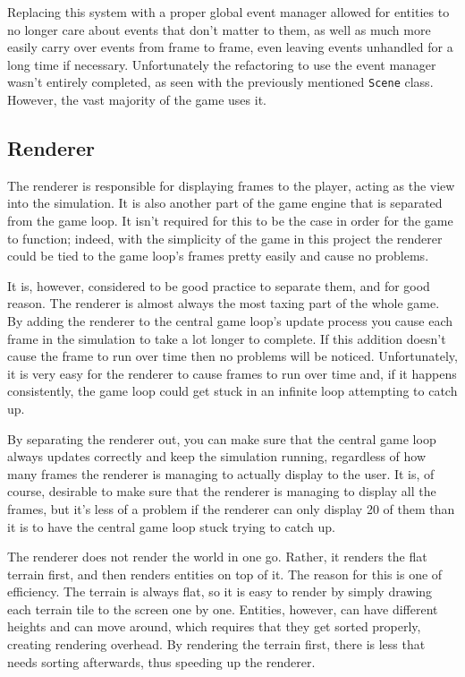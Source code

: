 Replacing this system with a proper global event manager allowed for entities to no longer care about events that don't matter to them, as well as much more easily carry over events from frame to frame, even leaving events unhandled for a long time if necessary. Unfortunately the refactoring to use the event manager wasn't entirely completed, as seen with the previously mentioned \texttt{Scene} class. However, the vast majority of the game uses it.

\subsection{Renderer}
The renderer is responsible for displaying frames to the player, acting as the view into the simulation. It is also another part of the game engine that is separated from the game loop. It isn't required for this to be the case in order for the game to function; indeed, with the simplicity of the game in this project the renderer could be tied to the game loop's frames pretty easily and cause no problems.

It is, however, considered to be good practice to separate them, and for good reason. The renderer is almost always the most taxing part of the whole game. By adding the renderer to the central game loop's update process you cause each frame in the simulation to take a lot longer to complete. If this addition doesn't cause the frame to run over time then no problems will be noticed. Unfortunately, it is very easy for the renderer to cause frames to run over time and, if it happens consistently, the game loop could get stuck in an infinite loop attempting to catch up.

By separating the renderer out, you can make sure that the central game loop always updates correctly and keep the simulation running, regardless of how many frames the renderer is managing to actually display to the user. It is, of course, desirable to make sure that the renderer is managing to display all the frames, but it's less of a problem if the renderer can only display 20 of them than it is to have the central game loop stuck trying to catch up.

The renderer does not render the world in one go. Rather, it renders the flat terrain first, and then renders entities on top of it. The reason for this is one of efficiency. The terrain is always flat, so it is easy to render by simply drawing each terrain tile to the screen one by one. Entities, however, can have different heights and can move around, which requires that they get sorted properly, creating rendering overhead. By rendering the terrain first, there is less that needs sorting afterwards, thus speeding up the renderer.

